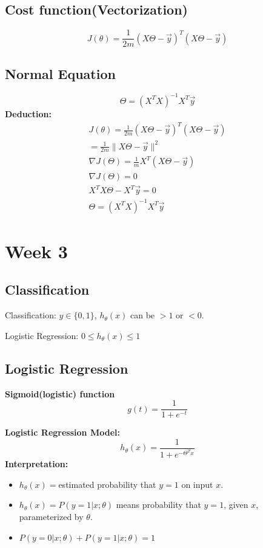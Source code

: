 \documentclass{article}
\begin{document}
\subsection{Cost function(Vectorization)}
$$J(\theta)=\frac{1}{2m}(X\Theta-\vec{y})^T(X\Theta-\vec{y})$$

\subsection{Normal Equation}
$$\Theta = (X^TX)^{-1}X^T\vec{y}$$
\textbf{Deduction:}
	\begin{eqnarray}
		J(\theta)=\frac{1}{2m}(X\Theta-\vec{y})^T(X\Theta-\vec{y})\nonumber\\
			=\frac{1}{2m}\lVert X\Theta - \vec{y}\rVert^2 \nonumber\\
		\nabla J(\Theta)=\frac{1}{m}X^T(X\Theta-\vec{y})\nonumber\\
		\nabla J(\Theta)=0 \nonumber \\
		X^TX\Theta-X^T\vec{y}=0 \nonumber \\
		\Theta = (X^TX)^{-1}X^T\vec{y} \nonumber
	\end{eqnarray}	
	
\section{Week 3}

\subsection{Classification} %
\flushleft
Classification: $y\in \{0,1\}$, $h_\theta(x) $ can be $> 1$ or  $< 0$.

Logistic Regression: $0\leq h_\theta(x)\leq 1$

\subsection{Logistic Regression} %
\textbf{Sigmoid(logistic) function}
\begin{displaymath}
	g(t)=\frac{1}{1+e^{-t}}
\end{displaymath}

\textbf{Logistic Regression Model:}
	\begin{displaymath}
		h_\theta(x)=\frac{1}{1+e^{-\Theta^Tx}}
	\end{displaymath}
\textbf{Interpretation:}
	\begin{itemize}
		\item $h_\theta(x)=$estimated probability that $y=1$ on input $x$.
		\item $h_\theta(x)=P(y=1|x;\theta)$ means probability that $y=1$, given $x$, parameterized by $\theta$.
		\item $P(y=0|x;\theta)+P(y=1|x;\theta)=1$	
	\end{itemize}
\end{document}
